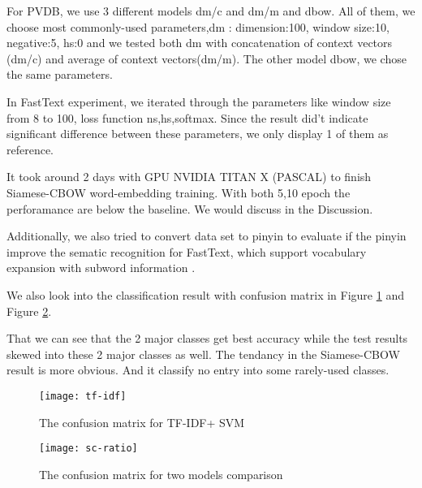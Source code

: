 For PVDB, we use 3 different models dm/c and dm/m and dbow. All of them, we choose most commonly-used parameters,dm : dimension:100, window size:10, negative:5, hs:0 and we tested both dm with concatenation of context vectors (dm/c) and average of context vectors(dm/m). 
The other model dbow, we chose the same parameters.

In FastText experiment, we iterated through the parameters like window size from 8 to 100, 
loss function ns,hs,softmax.  Since the result did't indicate significant difference between these parameters, 
we only display 1 of them as reference.

It took around 2 days with GPU NVIDIA TITAN X (PASCAL) to finish Siamese-CBOW word-embedding training. With both 5,10 epoch the perforamance are below the baseline. 
We would discuss in the Discussion. 

Additionally, we also tried to convert data set to pinyin to evaluate 
if the pinyin improve the sematic recognition for FastText, 
which support vocabulary expansion with subword information \cite{bojanowski2016enriching}. 

We also look into the classification result with confusion matrix in Figure \ref{confusion1} and Figure \ref{confusion2}.

That we can see that the 2 major classes get best accuracy while the test results skewed into these 2 major classes as well.  
The tendancy in the Siamese-CBOW result is more obvious. And it classify no entry into some rarely-used classes.

\begin{figure}[h]
    \centering
	\texttt{[image: tf-idf]}
    \caption{The confusion matrix for TF-IDF+ SVM}
    \label{confusion1}
\end{figure}

\begin{figure}[h]
    \centering
	\texttt{[image: sc-ratio]}
    \caption{The confusion matrix for two models comparison}
    \label{confusion2}
\end{figure}